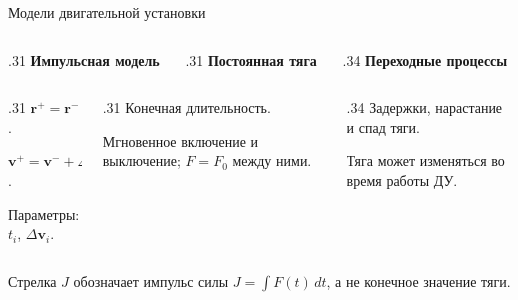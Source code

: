 \documentclass[11pt,aspectratio=169,t]{beamer}
\begin{document}
\begin{frame}{Модели двигательной установки}
\begin{columns}[T,onlytextwidth]
\begin{column}{.31\textwidth}\centering
\textcolor{courseaccent}{\textbf{Импульсная модель}}
\end{column}
\begin{column}{.31\textwidth}\centering
\textcolor{courseaccent}{\textbf{Постоянная тяга}}
\end{column}
\begin{column}{.34\textwidth}\centering
\textcolor{courseaccent}{\textbf{Переходные процессы}}
\end{column}
\end{columns}
\smallskip
\centering

\par
\begin{columns}[T,onlytextwidth]
\begin{column}{.31\textwidth}
$\mathbf r^+=\mathbf r^-$.\par
$\mathbf v^+=\mathbf v^-+\Delta\mathbf v$.\par
Параметры: $t_i$, $\Delta\mathbf v_i$.
\end{column}
\begin{column}{.31\textwidth}
Конечная длительность.\par
Мгновенное включение и выключение; $F=F_0$ между ними.
\end{column}
\begin{column}{.34\textwidth}
Задержки, нарастание и спад тяги.\par
Тяга может изменяться во время работы ДУ.
\end{column}
\end{columns}
\smallskip
{\color{coursemuted}
Стрелка $J$ обозначает импульс силы $J=\int F(t)\,dt$, а не конечное значение тяги.\par}
\end{frame}
\end{document}
